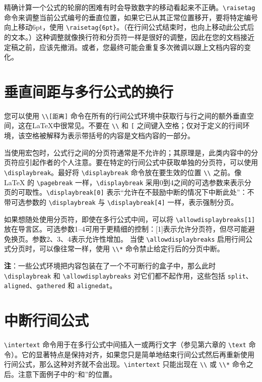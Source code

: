 精确计算一个公式的轮廓的困难有时会导致数字的移动看起来不正确。\verb|\raisetag| 命令来调整当前公式编号的垂直位置，如果它已从其正常位置移开，要将特定编号向上移动6pt，使用 \verb|\raisetag{6pt}|。（在行间公式结束时，也向上移动此公式后的文本。）这种调整就像换行符和分页符一样是很好的调整，因此在您的文档接近定稿之前，应该先撤消。或者，您最终可能会重复多次微调以跟上文档内容的变化。
\section{垂直间距与多行公式的换行}
您可以使用 \verb|\\[距离]| 命令在所有的行间公式环境中获取行与行之间的额外垂直空间，这在\LaTeX 中很常见。不要在 \verb|\\| 和 \verb|[| 之间键入空格；仅对于定义的行间环境，该空格被解释为表示带括号的内容是文档内容的一部分。

当使用宏包时，公式行之间的分页符通常是不允许的；其原理是，此类内容中的分页符应引起作者的个人注意。要在特定的行间公式中获取单独的分页符，可以使用\verb|\displaybreak|。最好将 \verb|\displaybreak| 命令放在要生效的位置 \verb|\\| 之前。像\LaTeX{} 的 \verb|\pagebreak| 一样，\verb|\displaybreak| 采用0到4之间的可选参数来表示分页的可取性。\verb|\displaybreak[0]| 表示“允许在不鼓励中断的情况下中断此处”：不带可选参数的 \verb|\displaybreak| 与 \verb|\displaybreak[4]| 一样，表示强制分页。

如果想随处使用分页符，即使在多行公式中间，可以将 \verb|\allowdisplaybreaks[1]| 放在导言区。可选参数1--4可用于更精细的控制：[1]表示允许分页符，但尽可能避免换页。参数2、3、4表示允许性增加。 当使 \verb|\allowdisplaybreaks| 启用行间公式分页时，可以像往常一样，使用 \verb|\\*| 命令禁止给定行后的分页中断。

\textbf{注}：一些公式环境把内容包装在了一个不可断行的盒子中，那么此时 \verb|\displaybreak| 和 \verb|\allowdisplaybreaks| 对它们都不起作用，这些包括 \verb|split|、\verb|aligned|、\verb|gathered| 和 \verb|alignedat|。
\section{中断行间公式}
\verb|\intertext| 命令用于在多行公式中间插入一或两行文字（参见第六章的 \verb|\text| 命令）。它的显著特点是保持对齐，如果您只是简单地结束行间公式然后再重新使用行间公式，那么这种对齐就不会出现。\verb|\intertext| 只能出现在 \verb|\\| 或 \verb|\\*| 命令之后。注意下面例子中的“和”的位置。

